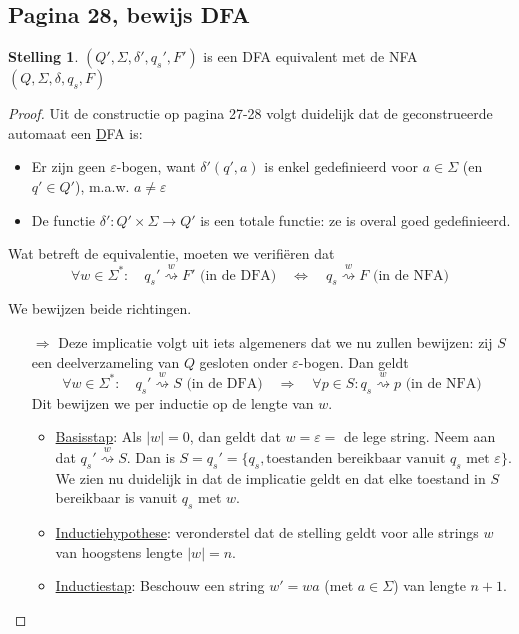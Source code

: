 \documentclass[kulak]{kulakarticle}
\newcommand{\epsilonbogen}{\( \varepsilon \)-bogen}
\let\epsilon\varepsilon
\newcommand{\abs}[1]{\lvert #1 \rvert}
\theoremstyle{definition}
\newtheorem*{stelling}{Stelling}
\begin{document}
	\subsection*{Pagina 28, bewijs DFA}

	\begin{stelling}
		\( (Q',\Sigma, \delta', q_s',F') \) is een DFA equivalent met de NFA \((Q,\Sigma,\delta,q_s,F)\)
	\end{stelling}

	\begin{proof}
		Uit de constructie op pagina 27-28 volgt duidelijk dat de geconstrueerde automaat een \underline{D}FA is:
		\begin{itemize}
			\item Er zijn geen \( \varepsilon \)-bogen, want \( \delta'(q',a) \) is enkel gedefinieerd voor \( a \in \Sigma \) (en \( q'\in Q' \)), m.a.w. \( a\neq \varepsilon \)
			\item De functie \( \delta':Q' \times \Sigma \to Q' \) is een totale functie: ze is overal goed gedefinieerd.
		\end{itemize}

		Wat betreft de equivalentie, moeten we verifiëren dat \[ \forall w \in \Sigma^*: \quad q_s' \overset{w}{\rightsquigarrow} F'  \text{ (in de DFA)} \quad \Longleftrightarrow \quad q_s \overset{w}{\rightsquigarrow} F \text{ (in de NFA)}\]

		We bewijzen beide richtingen.
		\begin{enumerate}
			\item[\( \Rightarrow \)] Deze implicatie volgt uit iets algemeners dat we nu zullen bewijzen: zij \(S\) een deelverzameling van \( Q \) gesloten onder \epsilonbogen. Dan geldt \[ \forall w \in \Sigma^*: \quad q_{s}' \overset{w}{\rightsquigarrow} S \text{ (in de DFA)} \quad \Longrightarrow \quad \forall p \in S: q_s \overset{w}{\rightsquigarrow} p \text{ (in de NFA)}  \] Dit bewijzen we per inductie op de lengte van \( w \).
			\begin{itemize}
				\item \underline{Basisstap}: Als \(\abs{w}=0\), dan geldt dat \(w = \epsilon = \) de lege string. Neem aan dat \(q_{s}' \overset{w}{\rightsquigarrow} S\). Dan is \(S=q_s'=\{q_s, \text{toestanden bereikbaar vanuit }q_s \text{ met }\epsilon\}\). We zien nu duidelijk in dat de implicatie geldt en dat elke toestand in \(S\) bereikbaar is vanuit \(q_s\) met \(w\).
				\item \underline{Inductiehypothese}: veronderstel dat de stelling geldt voor alle strings \(w\) van hoogstens lengte \(\abs{w}=n\).
				\item \underline{Inductiestap}: Beschouw een string \(w' = wa \) (met \(a \in \Sigma\)) van lengte \(n+1\).


\end{itemize}
\end{enumerate}
\end{proof}
\end{document}
